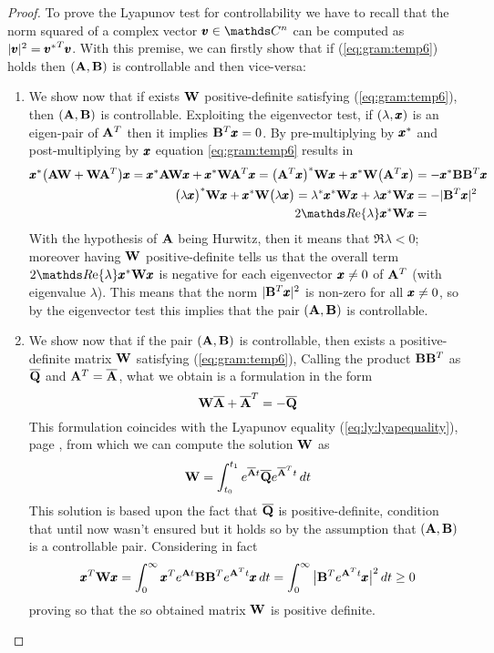	\begin{proof}
		To prove the Lyapunov test for controllability we have to recall that the norm squared of a complex vector $\vet v \in \mathds C^n$ can be computed as $|\pmb{v}|^2 = {\pmb{v}^*}^T \pmb{v}$. With this premise, we can firstly show that if (\ref{eq:gram:temp6}) holds then $(\mathbf{A},\mathbf{B})$ is controllable and then vice-versa:
		\begin{enumerate}[\itshape a)]
			\item We show now that if exists $\mathbf{W}$ positive-definite satisfying (\ref{eq:gram:temp6}), then $(\mathbf{A},\mathbf{B})$ is controllable. Exploiting the eigenvector test, if $(\lambda,\pmb{x})$ is an eigen-pair of $\mathbf{A}^T$ then it implies $\mathbf{B}^T\pmb{x} = 0$. By pre-multiplying by $\pmb{x}^*$ and post-multiplying by $\pmb{x}$ equation \ref{eq:gram:temp6} results in
			\begin{align*}
				\x^*\big(\A \mat W + \mat W \A^T\big)\x = \x^*\A \mat W \x + \x^*\mat W \A^T\x = \big(\A^T \x\big)^* \mat W\x + \x^* \mat W\big(\A^T \x\big) & = -\x^*\B\B^T\x \\
				\big(\lambda \x\big)^* \mat W \x + \x^* \mat W\big(\lambda \x\big) = \lambda^*\x^* \mat W \x + \lambda \x^* \mat W \x & = - |\B^T\x|^2 \\
				2\Re \lambda \x^* \mat W \x & = 
			\end{align*}
			With the hypothesis of $\mathbf{A}$ being Hurwitz, then it means that $\Re \lambda < 0$; moreover having $\mathbf{W}$ positive-definite tells us that the overall term $2\Re\lambda \x^*\mat W\x$ is negative for each eigenvector $\pmb{x} \neq 0$ of $\mathbf{A}^T$ (with eigenvalue $\lambda$). This means that the norm $|\mathbf{B}^T\pmb{x}|^2$ is non-zero for all $\pmb{x}\neq 0$, so by the eigenvector test this implies that the pair $(\mathbf{A},\mathbf{B})$ is controllable.
			
			\item We show now that if the pair $(\mathbf{A},\mathbf{B})$ is controllable, then exists a positive-definite matrix $\mathbf{W}$ satisfying (\ref{eq:gram:temp6}), Calling the product $\mathbf{B}\mathbf{B}^T$ as $\overline {\mathbf{Q}}$ and $\mathbf{A}^T = \overline {\mathbf{A}}$, what we obtain is a formulation in the form
			\[ \mathbf{W} \overline {\mathbf{A}} + \overline {\mathbf{A}}^T = - \overline {\mathbf{Q}} \]
			This formulation coincides with the Lyapunov equality (\ref{eq:ly:lyapequality}), page \pageref{eq:ly:lyapequality}, from which we can compute the solution $\mathbf{W}$ as
			\[ \mathbf{W} = \int_{t_0}^{t_1} e^{\overline {\mathbf{A}} t} \overline {\mathbf{Q}} e^{\overline {\mathbf{A}}^T t}\, dt \]
			This solution is based upon the fact that $\overline {\mathbf{Q}}$ is positive-definite, condition that until now wasn't ensured but it holds so by the assumption that $(\mathbf{A},\mathbf{B})$ is a controllable pair. Considering in fact
			\[ \pmb{x}^T \mathbf{W} \pmb{x} = \int_0^\infty \pmb{x}^T e^{\mathbf{A} t} \mathbf{B} \mathbf{B}^T e^{\mathbf{A}^Tt} \pmb{x}\, dt = \int_0^\infty \big| \mathbf{B}^T e^{\mathbf{A}^T t} \pmb{x} \big|^2\, dt \geq 0 \]
			proving so that the so obtained matrix $\mathbf{W}$ is positive definite.
		\end{enumerate}
	\end{proof}
	
